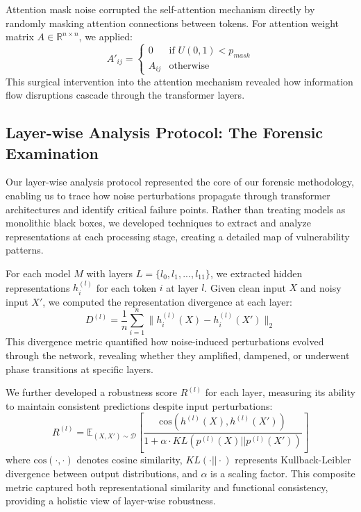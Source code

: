 Attention mask noise corrupted the self-attention mechanism directly by randomly masking attention connections between tokens. For attention weight matrix $A \in \mathbb{R}^{n \times n}$, we applied:
\begin{equation}
A'_{ij} = \begin{cases}
0 & \text{if } U(0,1) < p_{mask} \\
A_{ij} & \text{otherwise}
\end{cases}
\end{equation}
This surgical intervention into the attention mechanism revealed how information flow disruptions cascade through the transformer layers.

\subsection{Layer-wise Analysis Protocol: The Forensic Examination}

Our layer-wise analysis protocol represented the core of our forensic methodology, enabling us to trace how noise perturbations propagate through transformer architectures and identify critical failure points. Rather than treating models as monolithic black boxes, we developed techniques to extract and analyze representations at each processing stage, creating a detailed map of vulnerability patterns.

For each model $M$ with layers $L = \{l_0, l_1, ..., l_{11}\}$, we extracted hidden representations $h_i^{(l)}$ for each token $i$ at layer $l$. Given clean input $X$ and noisy input $X'$, we computed the representation divergence at each layer:
\begin{equation}
D^{(l)} = \frac{1}{n} \sum_{i=1}^n \| h_i^{(l)}(X) - h_i^{(l)}(X') \|_2
\end{equation}
This divergence metric quantified how noise-induced perturbations evolved through the network, revealing whether they amplified, dampened, or underwent phase transitions at specific layers.

We further developed a robustness score $R^{(l)}$ for each layer, measuring its ability to maintain consistent predictions despite input perturbations:
\begin{equation}
R^{(l)} = \mathbb{E}_{(X, X') \sim \mathcal{D}} \left[ \frac{\text{cos}(h^{(l)}(X), h^{(l)}(X'))}{1 + \alpha \cdot KL(p^{(l)}(X) || p^{(l)}(X'))} \right]
\end{equation}
where $\text{cos}(\cdot, \cdot)$ denotes cosine similarity, $KL(\cdot||\cdot)$ represents Kullback-Leibler divergence between output distributions, and $\alpha$ is a scaling factor. This composite metric captured both representational similarity and functional consistency, providing a holistic view of layer-wise robustness.

